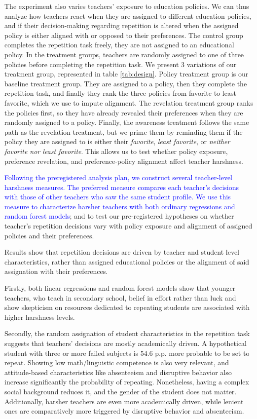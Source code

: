 \documentclass[12pt,a4paper]{article}
\begin{document}
The experiment also varies teachers' exposure to education policies. We can thus analyze how teachers react when they are assigned to different education policies, and if their decision-making regarding repetition is altered when the assigned policy is either aligned with or opposed to their preferences. The control group completes the repetition task freely, they are not assigned to an educational policy. In the treatment groups, teachers are randomly assigned to one of three policies before completing the repetition task. We present 3 variations of our treatment group, represented in table \ref{tab:design}. Policy treatment group is our baseline treatment group. They are assigned to a policy, then they complete the repetition task, and finally they rank the three policies from favorite to least favorite, which we use to impute alignment. The revelation treatment group ranks the policies first, so they have already revealed their preferences when they are randomly assigned to a policy. Finally, the awareness treatment follows the same path as the revelation treatment, but we prime them by reminding them if the policy they are assigned to is either their \textit{favorite}, \textit{least favorite}, or \textit{neither favorite nor least favorite}. This allows us to test whether policy exposure, preference revelation, and preference-policy alignment affect teacher harshness.

\textcolor{blue}{Following the preregistered analysis plan, we construct several teacher-level harshness measures. The preferred measure compares each teacher's decisions with those of other teachers who saw the same student profile. We use this measure to characterize harsher teachers with both ordinary regressions and  random forest models}; and to test our pre-registered hypotheses on whether teacher's repetition decisions vary with policy exposure and alignment of assigned policies and their preferences.

Results show that repetition decisions are driven by teacher and student level characteristics, rather than assigned educational policies or  the alignment of said assignation with their preferences. 

Firstly, both linear regressions and random forest models show that younger teachers, who teach in secondary school, belief in effort rather than luck and show skepticism on resources dedicated to repeating students are associated with higher harshness levels. 

Secondly, the random assignation of student characteristics in the repetition task suggests that teachers' decisions are mostly academically driven. A hypothetical student with three or more failed subjects is 54.6 p.p. more probable to be set to repeat. Showing low math/linguistic competence is also very relevant, and attitude-based characteristics like absenteeism and disruptive behavior also increase significantly the probability of repeating. Nonetheless, having a complex social background reduces it, and the gender of the student does not matter. Additionally, harsher teachers are even more academically driven, while lenient ones are comparatively more triggered by disruptive behavior and absenteeism.
\end{document}
